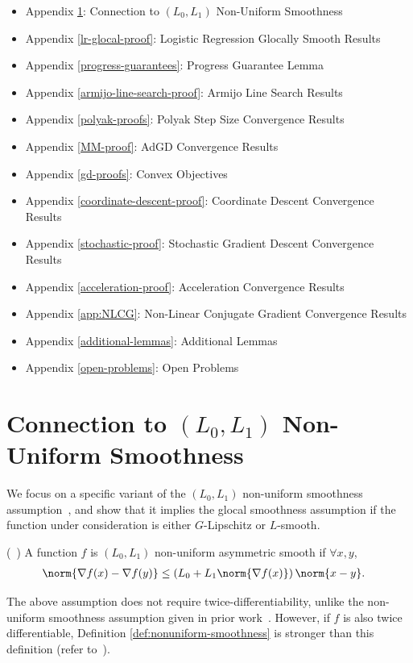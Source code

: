 \documentclass[10pt]{article} %
\begin{document}
\begin{itemize}
    \item Appendix \ref{non-uniform-section}: Connection to $(L_{0}, L_{1})$ Non-Uniform Smoothness
    \item Appendix \ref{lr-glocal-proof}: Logistic Regression Glocally Smooth Results
    \item Appendix \ref{progress-guarantees}: Progress Guarantee Lemma
    \item Appendix \ref{armijo-line-search-proof}: Armijo Line Search Results
    \item Appendix \ref{polyak-proofs}: Polyak Step Size Convergence Results
    \item Appendix \ref{MM-proof}: AdGD Convergence Results
    \item Appendix \ref{gd-proofs}: Convex Objectives
    \item Appendix \ref{coordinate-descent-proof}: Coordinate Descent Convergence Results
    \item Appendix \ref{stochastic-proof}: Stochastic Gradient Descent Convergence Results
    \item Appendix \ref{acceleration-proof}: Acceleration Convergence Results
    \item Appendix \ref{app:NLCG}: Non-Linear Conjugate Gradient Convergence Results
    \item Appendix \ref{additional-lemmas}: Additional Lemmas
    \item Appendix \ref{open-problems}: Open Problems
\end{itemize}
\fi

\section{Connection to $(L_{0}, L_{1})$ Non-Uniform Smoothness}\label{non-uniform-section}
We focus on a specific variant of the $(L_{0}, L_{1})$ non-uniform smoothness assumption~\cite{chen2023generalized}, and show that it implies the glocal smoothness assumption if the function under consideration is either $G$-Lipschitz or $L$-smooth.

\begin{definition}{(~\cite[Definition 2.1]{chen2023generalized})}
A function $f$ is $(L_0, L_1)$ non-uniform asymmetric smooth if $\forall x,y$, 
\begin{align*}
\norm{\nabla f(x) - \nabla f(y)} & \leq (L_0 + L_1 \norm{\nabla f(x)} ) \, \norm{x - y}.
\end{align*}
\label{def:nonuniform-smoothness}
\end{definition}
The above assumption does not require twice-differentiability, unlike the non-uniform smoothness assumption given in prior work~\cite{zhang2019gradient}. However, if $f$ is also twice differentiable, Definition \ref{def:nonuniform-smoothness} is stronger than this definition (refer to~\cite[Theorem 1]{chen2023generalized}).  
\end{document}
